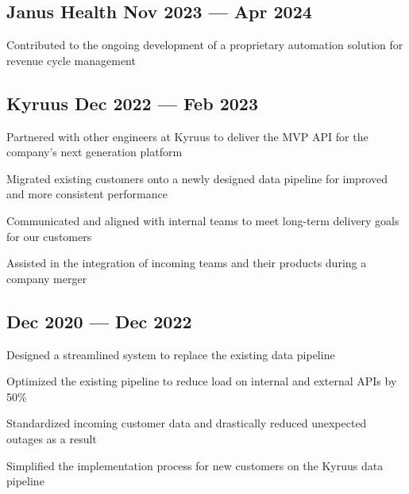 
\subsection{{Janus Health \hfill Nov 2023 --- Apr 2024}}
\begin{zitemize}
\item Contributed to the ongoing development of a proprietary automation solution for revenue cycle management
\end{zitemize}

\subsection{{Kyruus \hfill Dec 2022 --- Feb 2023}}
\begin{zitemize}
\item Partnered with other engineers at Kyruus to deliver the MVP API for the company's next generation platform
\item Migrated existing customers onto a newly designed data pipeline for improved and more consistent performance
\item Communicated and aligned with internal teams to meet long-term delivery goals for our customers
\item Assisted in the integration of incoming teams and their products during a company merger
\end{zitemize}

\subsection{{\hfill Dec 2020 --- Dec 2022}}
\begin{zitemize}
\item Designed a streamlined system to replace the existing data pipeline
\item Optimized the existing pipeline to reduce load on internal and external APIs by 50\%
\item Standardized incoming customer data and drastically reduced unexpected outages as a result
\item Simplified the implementation process for new customers on the Kyruus data pipeline
\end{zitemize}


